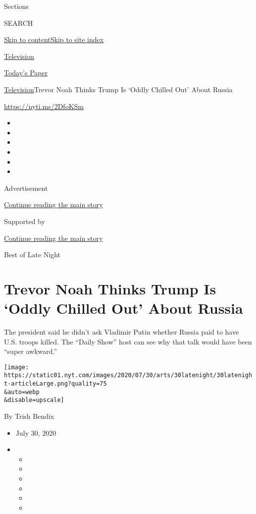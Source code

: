 Sections

SEARCH

\protect\hyperlink{site-content}{Skip to
content}\protect\hyperlink{site-index}{Skip to site index}

\href{https://www.nytimes.com/section/arts/television}{Television}

\href{https://myaccount.nytimes.com/auth/login?response_type=cookie\&client_id=vi}{}

\href{https://www.nytimes.com/section/todayspaper}{Today's Paper}

\href{/section/arts/television}{Television}\textbar{}Trevor Noah Thinks
Trump Is `Oddly Chilled Out' About Russia

\url{https://nyti.ms/2DfoKSm}

\begin{itemize}
\item
\item
\item
\item
\item
\item
\end{itemize}

Advertisement

\protect\hyperlink{after-top}{Continue reading the main story}

Supported by

\protect\hyperlink{after-sponsor}{Continue reading the main story}

Best of Late Night

\hypertarget{trevor-noah-thinks-trump-is-oddly-chilled-out-about-russia}{%
\section{Trevor Noah Thinks Trump Is `Oddly Chilled Out' About
Russia}\label{trevor-noah-thinks-trump-is-oddly-chilled-out-about-russia}}

The president said he didn't ask Vladimir Putin whether Russia paid to
have U.S. troops killed. The ``Daily Show'' host can see why that talk
would have been ``super awkward.''

\texttt{[image: https://static01.nyt.com/images/2020/07/30/arts/30latenight/30latenight-articleLarge.png?quality=75\\\&auto=webp\\\&disable=upscale]}

By Trish Bendix

\begin{itemize}
\item
  July 30, 2020
\item
  \begin{itemize}
  \item
  \item
  \item
  \item
  \item
  \item
  \end{itemize}
\end{itemize}

